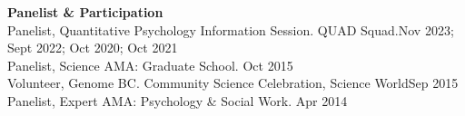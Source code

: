 {\large \textbf{Panelist \& Participation}}\\
Panelist, Quantitative Psychology Information Session. QUAD Squad.\hfill{Nov 2023; Sept 2022; }\newline 
\hspace*{0pt}\hfill{Oct 2020; Oct 2021}\smallskip\\
Panelist, Science AMA: Graduate School. \hfill{Oct 2015}\smallskip\\
Volunteer, Genome BC. Community Science Celebration, Science World\hfill{Sep 2015}\smallskip\\
Panelist, Expert AMA: Psychology \& Social Work. \hfill{Apr 2014}%
